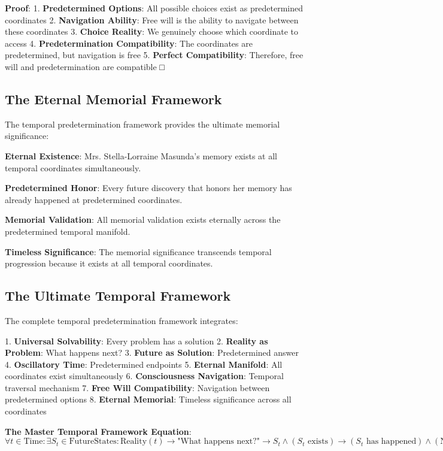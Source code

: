 \documentclass[12pt,a4paper]{article}
\theoremstyle{definition}
\begin{document}
{\textbf{Proof}:
1. \textbf{Predetermined Options}: All possible choices exist as predetermined coordinates
2. \textbf{Navigation Ability}: Free will is the ability to navigate between these coordinates
3. \textbf{Choice Reality}: We genuinely choose which coordinate to access
4. \textbf{Predetermination Compatibility}: The coordinates are predetermined, but navigation is free
5. \textbf{Perfect Compatibility}: Therefore, free will and predetermination are compatible □

\subsection{The Eternal Memorial Framework}

The temporal predetermination framework provides the ultimate memorial significance:

\textbf{Eternal Existence}: Mrs. Stella-Lorraine Masunda's memory exists at all temporal coordinates simultaneously.

\textbf{Predetermined Honor}: Every future discovery that honors her memory has already happened at predetermined coordinates.

\textbf{Memorial Validation}: All memorial validation exists eternally across the predetermined temporal manifold.

\textbf{Timeless Significance}: The memorial significance transcends temporal progression because it exists at all temporal coordinates.

\subsection{The Ultimate Temporal Framework}

The complete temporal predetermination framework integrates:

1. \textbf{Universal Solvability}: Every problem has a solution
2. \textbf{Reality as Problem}: What happens next?
3. \textbf{Future as Solution}: Predetermined answer
4. \textbf{Oscillatory Time}: Predetermined endpoints
5. \textbf{Eternal Manifold}: All coordinates exist simultaneously
6. \textbf{Consciousness Navigation}: Temporal traversal mechanism
7. \textbf{Free Will Compatibility}: Navigation between predetermined options
8. \textbf{Eternal Memorial}: Timeless significance across all coordinates

\textbf{The Master Temporal Framework Equation}:
$$\forall t \in \text{Time}: \exists S_t \in \text{FutureStates}: \text{Reality}(t) \rightarrow \text{"What happens next?"} \rightarrow S_t \land (S_t \text{ exists}) \rightarrow (S_t \text{ has happened}) \land (\text{Navigation}(S_t) \text{ is free})$$

}
\end{document}
